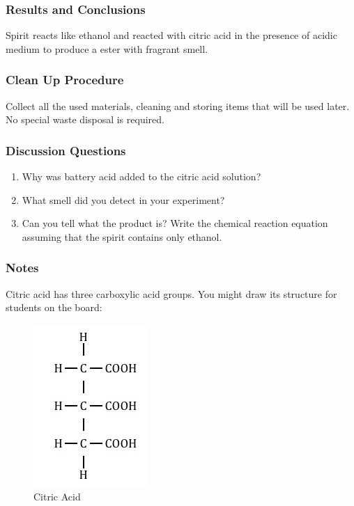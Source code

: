 \subsubsection*{Results and Conclusions}
Spirit reacts like ethanol and reacted with citric acid in the presence of acidic medium to produce a ester with fragrant smell.

\subsubsection*{Clean Up Procedure}
Collect all the used materials, cleaning and storing items that will be used later. No special waste disposal is required.

\subsubsection*{Discussion Questions}
\begin{enumerate}
\item{Why was battery acid added to the citric acid solution?}
\item{What smell did you detect in your experiment?}
\item{Can you tell what the product is? Write the chemical reaction equation assuming that the spirit contains only ethanol.}
\end{enumerate}

\subsubsection*{Notes}
Citric acid has three carboxylic acid groups. You might draw its structure for students on the board: 
\begin{center}
\begin{figure}[h]
\begin{center}\includegraphics[scale=0.5]{img/citric-acid.png}\end{center}
\caption{Citric Acid}
\end{figure}
\end{center}


